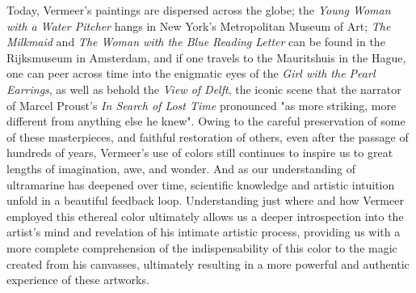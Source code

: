 Today, Vermeer's paintings are dispersed across the globe; the
\emph{Young Woman with a Water Pitcher} hangs in New York's Metropolitan
Museum of Art; \emph{The Milkmaid} and \emph{The Woman with the Blue
Reading Letter} can be found in the Rijksmuseum in Amsterdam, and if one
travels to the Mauritshuis in the Hague, one can peer across time into
the enigmatic eyes of the \emph{Girl with the Pearl Earrings}, as well
as behold the \emph{View of Delft}, the iconic scene that the narrator
of Marcel Proust's \emph{In Search of Lost Time} pronounced "as more
striking, more different from anything else he knew". Owing to the
careful preservation of some of these masterpieces, and faithful
restoration of others, even after the passage of hundreds of years,
Vermeer's use of colors still continues to inspire us to great lengths
of imagination, awe, and wonder. And as our understanding of ultramarine
has deepened over time, scientific knowledge and artistic intuition
unfold in a beautiful feedback loop. Understanding just where and how
Vermeer employed this ethereal color ultimately allows us a deeper
introspection into the artist's mind and revelation of his intimate
artistic process, providing us with a more complete comprehension of the
indispensability of this color to the magic created from his canvasses,
ultimately resulting in a more powerful and authentic experience of
these artworks.

